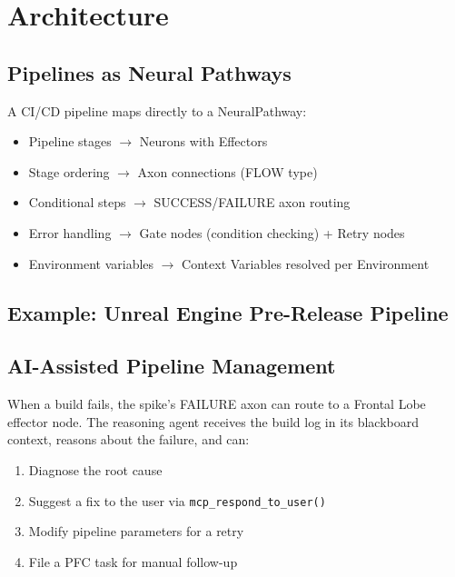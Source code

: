 \documentclass[man,12pt,floatsintext]{apa7}
\begin{document}

\section{Architecture}

\subsection{Pipelines as Neural Pathways}

A CI/CD pipeline maps directly to a NeuralPathway:

\begin{itemize}
  \item Pipeline stages $\rightarrow$ Neurons with Effectors
  \item Stage ordering $\rightarrow$ Axon connections (FLOW type)
  \item Conditional steps $\rightarrow$ SUCCESS/FAILURE axon routing
  \item Error handling $\rightarrow$ Gate nodes (condition checking) + Retry nodes
  \item Environment variables $\rightarrow$ Context Variables resolved per Environment
\end{itemize}

\subsection{Example: Unreal Engine Pre-Release Pipeline}


\subsection{AI-Assisted Pipeline Management}

When a build fails, the spike's FAILURE axon can route to a Frontal Lobe effector node.
The reasoning agent receives the build log in its blackboard context, reasons about the
failure, and can:

\begin{enumerate}
  \item Diagnose the root cause
  \item Suggest a fix to the user via \texttt{mcp\_respond\_to\_user()}
  \item Modify pipeline parameters for a retry
  \item File a PFC task for manual follow-up
\end{enumerate}
\end{document}
